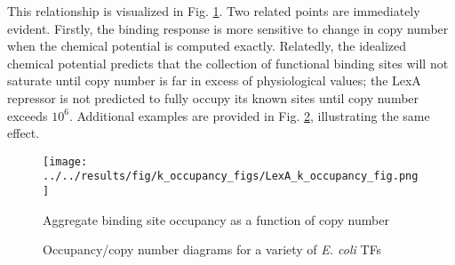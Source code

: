 \documentclass{article}
\begin{document}




  This relationship is visualized in Fig.
  \ref{fig:occupancy_vs_copy_number}.  Two related points are
  immediately evident.  Firstly, the binding response is more
  sensitive to change in copy number when the chemical potential is
  computed exactly.  Relatedly, the idealized chemical potential
  predicts that the collection of functional binding sites will not
  saturate until copy number is far in excess of physiological values;
  the LexA repressor is not predicted to fully occupy its known sites
  until copy number exceeds $10^6$.  Additional examples are provided
  in Fig. \ref{fig:occupancy_vs_copy_number_examples}, illustrating
  the same effect.

  \begin{figure}[ht]
    \centering
    \texttt{[image: ../../results/fig/k\_occupancy\_figs/LexA\_k\_occupancy\_fig.png]}
    \caption{Aggregate binding site occupancy as a function of copy number}
    \label{fig:occupancy_vs_copy_number}
  \end{figure}

  \begin{figure}[ht]
  \centering
{}
  \caption{Occupancy/copy number diagrams for a variety of \textit{E. coli} TFs}
  \label{fig:occupancy_vs_copy_number_examples}
\end{figure}
\end{document}
